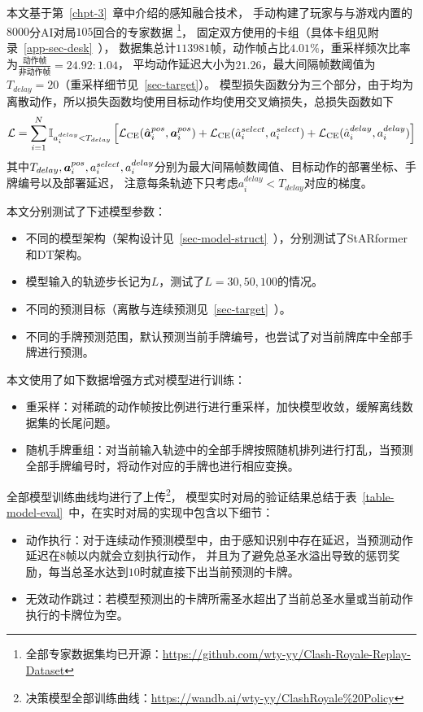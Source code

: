 \label{sec-decision-model}
本文基于第~\ref{chpt-3}~章中介绍的感知融合技术，
手动构建了玩家与与游戏内置的$8000$分AI对局$105$回合的专家数据
\footnote{全部专家数据集均已开源：\url{https://github.com/wty-yy/Clash-Royale-Replay-Dataset}}，
固定双方使用的卡组（具体卡组见附录~\ref{app-sec-desk}~），
数据集总计$113981$帧，动作帧占比$4.01\%$，重采样频次比率为$\frac{\text{动作帧}}{\text{非动作帧}}=24.92:1.04$，
平均动作延迟大小为$21.26$，最大间隔帧数阈值为$T_{delay}=20$（重采样细节见~\ref{sec-target}）。
模型损失函数分为三个部分，由于均为离散动作，所以损失函数均使用目标动作均使用交叉熵损失，总损失函数如下
\begin{equation}
  \mathcal{L} =
  \sum_{\substack{i=1\\}}^N\mathbb{I}_{a_i^{delay} < T_{delay}}\left[\mathcal{L}_{\text{CE}}(\hat{\boldsymbol{a}}_i^{pos}, \boldsymbol{a}_i^{pos})+
  \mathcal{L}_{\text{CE}}(\hat{a}_i^{select}, a_i^{select}) + 
  \mathcal{L}_{\text{CE}}(\hat{a}_i^{delay}, a_i^{delay})\right]
\end{equation}
其中$T_{delay},\boldsymbol{a}_i^{pos},a_i^{select},a_i^{delay}$分别为最大间隔帧数阈值、目标动作的部署坐标、手牌编号以及部署延迟，
注意每条轨迹下只考虑$a_i^{delay} < T_{delay}$对应的梯度。

本文分别测试了下述模型参数：
\begin{itemize}
  \item 不同的模型架构（架构设计见~\ref{sec-model-struct}~），分别测试了StARformer和DT架构。
  \item 模型输入的轨迹步长记为$L$，测试了$L=30,50,100$的情况。
  \item 不同的预测目标（离散与连续预测见~\ref{sec-target}~）。
  \item 不同的手牌预测范围，默认预测当前手牌编号，也尝试了对当前牌库中全部手牌进行预测。
\end{itemize}

本文使用了如下数据增强方式对模型进行训练：
\begin{itemize}
  \item 重采样：对稀疏的动作帧按比例进行进行重采样，加快模型收敛，缓解离线数据集的长尾问题。
  \item 随机手牌重组：对当前输入轨迹中的全部手牌按照随机排列进行打乱，当预测全部手牌编号时，将动作对应的手牌也进行相应变换。
\end{itemize}

全部模型训练曲线均进行了上传\footnote{决策模型全部训练曲线：\url{https://wandb.ai/wty-yy/ClashRoyale\%20Policy}}，
模型实时对局的验证结果总结于表~\ref{table-model-eval}~中，在实时对局的实现中包含以下细节：
\begin{itemize}
  \item 动作执行：对于连续动作预测模型中，由于感知识别中存在延迟，当预测动作延迟在$8$帧以内就会立刻执行动作，
  并且为了避免总圣水溢出导致的惩罚奖励，每当总圣水达到$10$时就直接下出当前预测的卡牌。
  \item 无效动作跳过：若模型预测出的卡牌所需圣水超出了当前总圣水量或当前动作执行的卡牌位为空。
\end{itemize}


